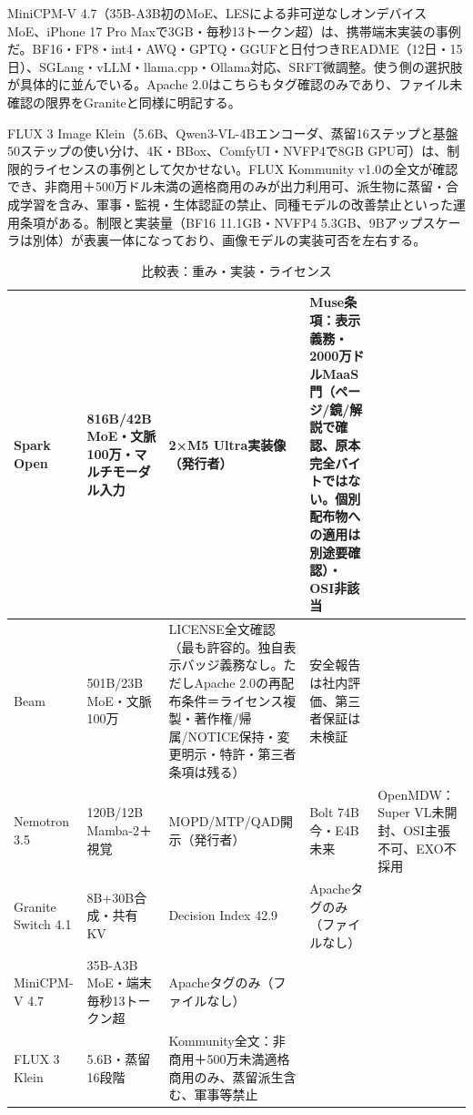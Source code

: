 \documentclass[lualatex,a4paper,10pt]{jlreq}
\begin{document}
MiniCPM-V 4.7（35B-A3B初のMoE、LESによる非可逆なしオンデバイスMoE、iPhone 17 Pro Maxで3GB・毎秒13トークン超）は、携帯端末実装の事例だ。BF16・FP8・int4・AWQ・GPTQ・GGUFと日付つきREADME（12日・15日）、SGLang・vLLM・llama.cpp・Ollama対応、SRFT微調整。使う側の選択肢が具体的に並んでいる。Apache 2.0はこちらもタグ確認のみであり、ファイル未確認の限界をGraniteと同様に明記する。
\cite{B27,B74,B26}


FLUX 3 Image Klein（5.6B、Qwen3-VL-4Bエンコーダ、蒸留16ステップと基盤50ステップの使い分け、4K・BBox、ComfyUI・NVFP4で8GB GPU可）は、制限的ライセンスの事例として欠かせない。FLUX Kommunity v1.0の全文が確認でき、非商用＋500万ドル未満の適格商用のみが出力利用可、派生物に蒸留・合成学習を含み、軍事・監視・生体認証の禁止、同種モデルの改善禁止といった運用条項がある。制限と実装量（BF16 11.1GB・NVFP4 5.3GB、9Bアップスケーラは別体）が表裏一体になっており、画像モデルの実装可否を左右する。
\cite{B29,B28,B30}


\begin{table}[htbp]\centering\footnotesize
\caption{比較表：重み・実装・ライセンス}
\begin{tabularx}{0.96\linewidth}{@{}lXXXX@{}}
\toprule
Spark Open & 816B/42B MoE・文脈100万・マルチモーダル入力 & 2×M5 Ultra実装像（発行者） & Muse条項：表示義務・2000万ドルMaaS門（ページ/鏡/解説で確認、原本完全バイトではない。個別配布物への適用は別途要確認）・OSI非該当 \cite{B14,B70,B15,B13} \\
\midrule
Beam & 501B/23B MoE・文脈100万 & LICENSE全文確認（最も許容的。独自表示バッジ義務なし。ただしApache 2.0の再配布条件＝ライセンス複製・著作権/帰属/NOTICE保持・変更明示・特許・第三者条項は残る） & 安全報告は社内評価、第三者保証は未検証 \cite{B17,B19,B18,B16} \\
\midrule
Nemotron 3.5 & 120B/12B Mamba-2＋視覚 & MOPD/MTP/QAD開示（発行者） & Bolt 74B今・E4B未来 & OpenMDW：Super VL未開封、OSI主張不可、EXO不採用 \cite{B21,B72,B22,B20} \\
\midrule
Granite Switch 4.1 & 8B+30B合成・共有KV & Decision Index 42.9 & Apacheタグのみ（ファイルなし） \cite{B24,B73,B23,B25} \\
\midrule
MiniCPM-V 4.7 & 35B-A3B MoE・端末毎秒13トークン超 & Apacheタグのみ（ファイルなし） \cite{B27,B74,B26} \\
\midrule
FLUX 3 Klein & 5.6B・蒸留16段階 & Kommunity全文：非商用＋500万未満適格商用のみ、蒸留派生含む、軍事等禁止 \cite{B29,B28,B30} \\
\bottomrule
\end{tabularx}
\end{table}
\end{document}
